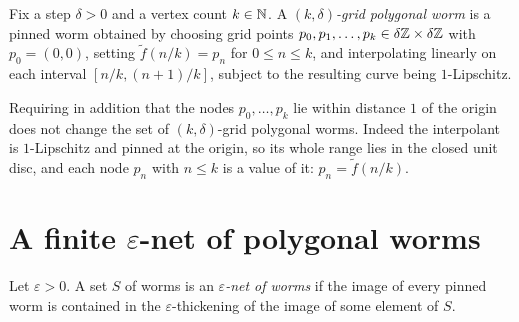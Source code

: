 \begin{definition}
    \label{def:gridPolygonalWorm}
    Fix a step $\delta > 0$ and a vertex count $k \in \mathbb{N}$. A
    \emph{$(k,\delta)$-grid polygonal worm} is a pinned worm obtained by
    choosing grid points $p_0, p_1, \dots, p_k \in \delta\mathbb{Z} \times \delta\mathbb{Z}$
    with $p_0 = (0,0)$, setting $\tilde f(n/k) = p_n$ for $0 \le n \le k$, and
    interpolating linearly on each interval $[n/k, (n+1)/k]$, subject to the
    resulting curve being $1$-Lipschitz.
\end{definition}

\begin{lemma}
    \label{lem:gridNodesInDisc}
    \leanok
    Requiring in addition that the nodes $p_0, \dots, p_k$ lie within distance
    $1$ of the origin does not change the set of $(k,\delta)$-grid polygonal
    worms. Indeed the interpolant is $1$-Lipschitz and pinned at the origin, so
    its whole range lies in the closed unit disc, and each node $p_n$ with
    $n \le k$ is a value of it: $p_n = \tilde f(n/k)$.
\end{lemma}

\section{A finite \texorpdfstring{$\varepsilon$}{epsilon}-net of polygonal worms}

\begin{definition}
    \label{def:epsilonNet}
    Let $\varepsilon > 0$. A set $S$ of worms is an \emph{$\varepsilon$-net of
    worms} if the image of every pinned worm is contained in the
    $\varepsilon$-thickening of the image of some element of $S$.
\end{definition}

